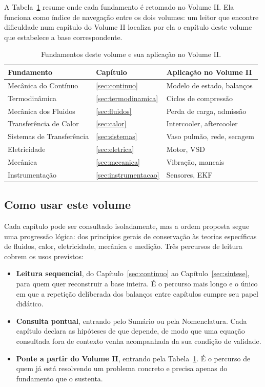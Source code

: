 \documentclass[12pt,a4paper]{article}
\numberwithin{equation}{section}
\numberwithin{table}{section}
\numberwithin{figure}{section}
\begin{document}
A Tabela~\ref{tab:v1-c1-1} resume onde cada fundamento é retomado no Volume II.
Ela funciona como índice de navegação entre os dois volumes: um leitor que
encontre dificuldade num capítulo do Volume II localiza por ela o capítulo
deste volume que estabelece a base correspondente.

\begin{table}[H]
\centering
\caption[Mapeamento entre fundamentos e Volume II]{Fundamentos deste volume
e sua aplicação no Volume II.}
\label{tab:v1-c1-1}
\begin{tabular}{@{}lll@{}}
\toprule
\textbf{Fundamento} & \textbf{Capítulo} & \textbf{Aplicação no Volume II} \\
\midrule
Mecânica do Contínuo & \ref{sec:continuo} & Modelo de estado, balanços \\
Termodinâmica & \ref{sec:termodinamica} & Ciclos de compressão \\
Mecânica dos Fluidos & \ref{sec:fluidos} & Perda de carga, admissão \\
Transferência de Calor & \ref{sec:calor} & Intercooler, aftercooler \\
Sistemas de Transferência & \ref{sec:sistemas} & Vaso pulmão, rede, secagem \\
Eletricidade & \ref{sec:eletrica} & Motor, VSD \\
Mecânica & \ref{sec:mecanica} & Vibração, mancais \\
Instrumentação & \ref{sec:instrumentacao} & Sensores, EKF \\
\bottomrule
\end{tabular}
\end{table}

\subsection{Como usar este volume}

Cada capítulo pode ser consultado isoladamente, mas a ordem proposta segue uma
progressão lógica: dos princípios gerais de conservação às teorias específicas
de fluidos, calor, eletricidade, mecânica e medição. Três percursos de leitura
cobrem os usos previstos:

\begin{itemize}
	\item \textbf{Leitura sequencial}, do Capítulo~\ref{sec:continuo} ao
	Capítulo~\ref{sec:sintese}, para quem quer reconstruir a base inteira. É o
	percurso mais longo e o único em que a repetição deliberada dos balanços
	entre capítulos cumpre seu papel didático.
	\item \textbf{Consulta pontual}, entrando pelo Sumário ou pela
	Nomenclatura. Cada capítulo declara as hipóteses de que depende, de modo
	que uma equação consultada fora de contexto venha acompanhada da sua
	condição de validade.
	\item \textbf{Ponte a partir do Volume II}, entrando pela
	Tabela~\ref{tab:v1-c1-1}. É o percurso de quem já está resolvendo um
	problema concreto e precisa apenas do fundamento que o sustenta.
\end{itemize}
\end{document}
